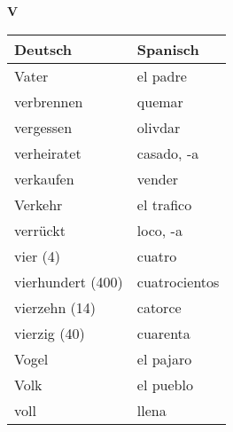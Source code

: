 \begin{flushright}\begin{Huge}\textbf{V}\end{Huge}\end{flushright}

\begin{longtable}{p{} p{}} 
\textbf{Deutsch}     & \textbf{Spanisch}                                       \\ \hline
\hline
\endhead %
Vater & el padre\\
verbrennen & quemar \\
vergessen & olivdar\\
verheiratet & casado, -a\\
verkaufen & vender\\
Verkehr & el trafico\\
verrückt & loco, -a\\
vier (4) & cuatro\\
vierhundert (400) & cuatrocientos\\
vierzehn (14) & catorce\\
vierzig (40) & cuarenta\\
Vogel & el pajaro\\
Volk & el pueblo\\
voll & llena
\end{longtable}
